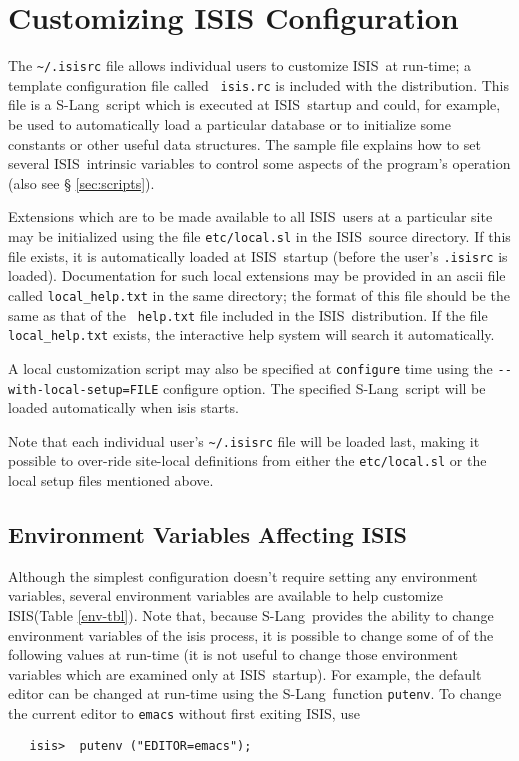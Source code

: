 \documentclass{book}
\newcommand{\isisx}{{\sc ISIS~}}
\newcommand{\isis}{{\sc ISIS}}
\newcommand{\slang}{{\sc S-Lang}}
\begin{document}
{\chapter{Customizing ISIS Configuration}
\label{chap:custom}

The \verb|~/.isisrc| file allows individual users to customize
\isisx at run-time; a template configuration file called {\tt
isis.rc} is included with the distribution. This file is a \slang{}ript which is executed at \isisx startup and could, for example,
be used to automatically load a particular database or to
initialize some constants or other useful data structures. The
sample file explains how to set several \isisx intrinsic variables
to control some aspects of the program's operation (also see \S
\ref{sec:scripts}).

Extensions which are to be made
available to all \isisx users at a particular site may be
initialized using the file {\tt etc/local.sl} in the \isisx source
directory. If this file exists, it is automatically loaded at
\isisx startup (before the user's {\tt .isisrc} is loaded).
Documentation for such local extensions may be provided in an
ascii file called {\tt local\_help.txt} in the same directory; the
format of this file should be the same as that of the {\tt
help.txt} file included in the \isisx distribution.  If the file
{\tt local\_help.txt} exists, the interactive help system will
search it automatically.

A local customization script may also be specified at \verb|configure| time
using the \verb|--with-local-setup=FILE| configure option.  The
specified \slang{}ript will be loaded automatically when
isis starts.

Note that each individual user's \verb|~/.isisrc| file will be loaded last,
making it possible to over-ride site-local definitions from either the
\verb|etc/local.sl| or the local setup files mentioned above.

\section{Environment Variables Affecting ISIS}
\label{sec:env-var}

Although the simplest configuration doesn't require setting any
environment variables, several environment variables are available to
help customize \isis (Table \ref{env-tbl}).  Note that, because \slang\
provides the ability to change environment variables of the isis process, it
is possible to change some of of the following values at run-time
(it is not useful to change those environment variables which are examined
only at \isisx startup).  For example, the default editor can be changed at
run-time using the \slang\ function {\tt putenv}.  To change the current
editor to {\tt emacs} without first exiting \isis, use
\begin{verbatim}
   isis>  putenv ("EDITOR=emacs");
\end{verbatim}

}
\end{document}
